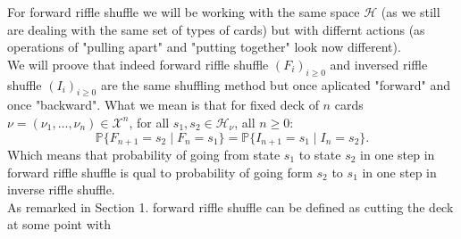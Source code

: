 \documentclass[a4paper, 12pt]{report}
\begin{document}
For forward riffle shuffle we will be working with the same space $\mathcal{H}$ (as we still 
are dealing with the same set of types of cards) but with differnt actions (as operations of "pulling apart" 
and "putting together" look now different). \\
We will proove that indeed forward riffle shuffle $(F_i)_{i \geq 0}$ and inversed riffle shuffle 
$(I_i)_{i \geq 0}$ are the same shuffling method 
but once aplicated "forward" and once "backward". What we mean is that for fixed deck of $n$ cards 
$\nu = (\nu_1, \dots, \nu_n) \in \mathcal{X}^n$, for all $s_1, s_2 \in \mathcal{H}_\nu$, all $n \geq 0$:
\begin{equation*}
\mathbb{P}\{F_{n+1} = s_2 \mid F_n = s_1\} = \mathbb{P}\{I_{n+1} = s_1 \mid I_n = s_2\}.
\end{equation*} 
Which means that probability of going from state $s_1$ to state $s_2$ in one step in forward riffle shuffle 
is qual to probability of going form $s_2$ to $s_1$ in one step in  inverse riffle shuffle. \\
As remarked in Section 1. forward riffle shuffle can be defined as cutting the deck at some point with 
\end{document}
